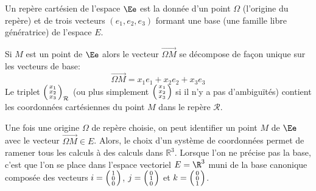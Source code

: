 
\begin{definition}
Un repère cartésien de l'espace $\Ee$ est la donnée d'un point $\Omega$ (l'origine du repère) et de trois vecteurs $(e_1,e_2,e_3)$ formant une base (\ie une famille libre g\'en\'eratrice) de l'espace $E$.
\end{definition}
\pl{\rep{3cm}}
\begin{definition}
	Si $M$ est un point de $\Ee$ alors le vecteur $\overrightarrow{\Omega M}$ se décompose de façon unique sur les vecteurs de base:
	\[
		\overrightarrow{\Omega M} = x_1 e_1 + x_2 e_2 + x_3 e_3 
	\]
	Le triplet $\begin{psmallmatrix}x_1 \\ x_2 \\ x_3\end{psmallmatrix}_{\mathcal R}$ (ou plus simplement $\begin{psmallmatrix}x_1\\x_2\\ x_3\end{psmallmatrix}$ si il n'y a pas d'ambiguïtés) contient les coordonnées cartésiennes du point $M$ dans le repère $\mathcal R$.
\end{definition}
\pl{\rep{3cm}}

\sld{\vfill\pagebreak[5]}%
\begin{remark}
	Une fois une origine $\Omega$ de repère choisie, on peut identifier un point $M$ de $\Ee$ avec le vecteur $\overrightarrow{\Omega M} \in E$. 
	Alors, le choix d'un syst\`eme de coordonn\'ees permet de ramener tous les calculs \`a des calculs dans $\mathbb R^3.$
	Lorsque l'on ne précise pas la base, c'est que l'on se place dans l'espace vectoriel $E = \R^3$ muni de la base canonique composée des vecteurs $i = \begin{psmallmatrix}1\\0\\0\end{psmallmatrix}$, $j=\begin{psmallmatrix}0\\1\\0\end{psmallmatrix}$ et $k=\begin{psmallmatrix}0\\0\\1\end{psmallmatrix}$. 
\end{remark}

